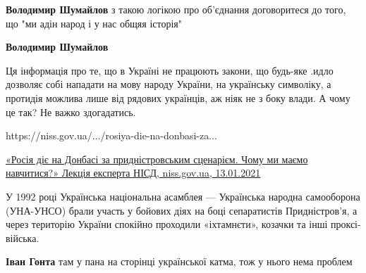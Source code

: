 \begin{itemize}
\begin{itemize}
 
\textbf{Володимир Шумайлов} з такою логікою про об'єднання договоритеся до того, що "ми адін народ і у нас общяя історія"

 
\textbf{Володимир Шумайлов} 

Ця інформація про те, що в Україні не працюють закони, що будь-яке .идло
дозволяє собі нападати на мову народу України, на українську символіку, а
протидія можлива лише від рядових українців, аж ніяк не з боку влади. А чому це
так? Не важко здогадатись.

 
https://niss.gov.ua/.../rosiya-die-na-donbasi-za... 

\href{https://niss.gov.ua/news/komentari-ekspertiv/rosiya-die-na-donbasi-za-pridnistrovskim-scenariem-chomu-mi-maemo}{%
«Росія діє на Донбасі за придністровським сценарієм. Чому ми маємо навчитися?» Лекція експерта НІСД, niss.gov.ua, 13.01.2021%
}

У 1992 році Українська національна асамблея — Українська народна самооборона
(УНА-УНСО) брали участь у бойових діях на боці сепаратистів Придністров’я, а
через територію України спокійно проходили «іхтамнєти», козачки та інші
проксі-війська.

 
\textbf{Іван Гонта} там у пана на сторінці української катма, тож у нього нема проблем

\end{itemize}


\end{itemize}
